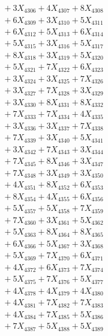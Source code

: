 \documentclass[a4paper,10pt]{article}
\begin{document}
{\begin{align}
&\;  + 3 X_{4306} + 4 X_{4307} + 8 X_{4308} \\[0.3ex]
&\;  + 6 X_{4309} + 3 X_{4310} + 5 X_{4311} \\[0.3ex]
&\;  + 6 X_{4312} + 5 X_{4313} + 6 X_{4314} \\[0.3ex]
&\;  + 5 X_{4315} + 3 X_{4316} + 5 X_{4317} \\[0.3ex]
&\;  + 8 X_{4318} + 3 X_{4319} + 5 X_{4320} \\[0.3ex]
&\;  + 5 X_{4321} + 7 X_{4322} + 6 X_{4323} \\[0.3ex]
&\;  + 3 X_{4324} + 3 X_{4325} + 7 X_{4326} \\[0.3ex]
&\;  + 3 X_{4327} + 7 X_{4328} + 3 X_{4329} \\[0.5ex]\allowbreak
&\;  + 3 X_{4330} + 8 X_{4331} + 8 X_{4332} \\[0.3ex]
&\;  + 7 X_{4333} + 7 X_{4334} + 4 X_{4335} \\[0.3ex]
&\;  + 3 X_{4336} + 3 X_{4337} + 7 X_{4338} \\[0.3ex]
&\;  + 7 X_{4339} + 3 X_{4340} + 5 X_{4341} \\[0.3ex]
&\;  + 3 X_{4342} + 7 X_{4343} + 3 X_{4344} \\[0.3ex]
&\;  + 7 X_{4345} + 8 X_{4346} + 3 X_{4347} \\[0.3ex]
&\;  + 7 X_{4348} + 3 X_{4349} + 3 X_{4350} \\[0.3ex]
&\;  + 4 X_{4351} + 8 X_{4352} + 6 X_{4353} \\[0.3ex]
&\;  + 8 X_{4354} + 4 X_{4355} + 6 X_{4356} \\[0.3ex]
&\;  + 5 X_{4357} + 5 X_{4358} + 7 X_{4359} \\[0.5ex]\allowbreak
&\;  + 7 X_{4360} + 3 X_{4361} + 5 X_{4362} \\[0.3ex]
&\;  + 5 X_{4363} + 8 X_{4364} + 8 X_{4365} \\[0.3ex]
&\;  + 6 X_{4366} + 5 X_{4367} + 3 X_{4368} \\[0.3ex]
&\;  + 5 X_{4369} + 7 X_{4370} + 6 X_{4371} \\[0.3ex]
&\;  + 4 X_{4372} + 6 X_{4373} + 7 X_{4374} \\[0.3ex]
&\;  + 5 X_{4375} + 7 X_{4376} + 5 X_{4377} \\[0.3ex]
&\;  + 4 X_{4378} + 4 X_{4379} + 4 X_{4380} \\[0.3ex]
&\;  + 4 X_{4381} + 7 X_{4382} + 7 X_{4383} \\[0.3ex]
&\;  + 4 X_{4384} + 7 X_{4385} + 5 X_{4386} \\[0.3ex]
&\;  + 7 X_{4387} + 5 X_{4388} + 5 X_{4389} \\[0.5ex]\allowbreak

\end{align}}
\end{document}
